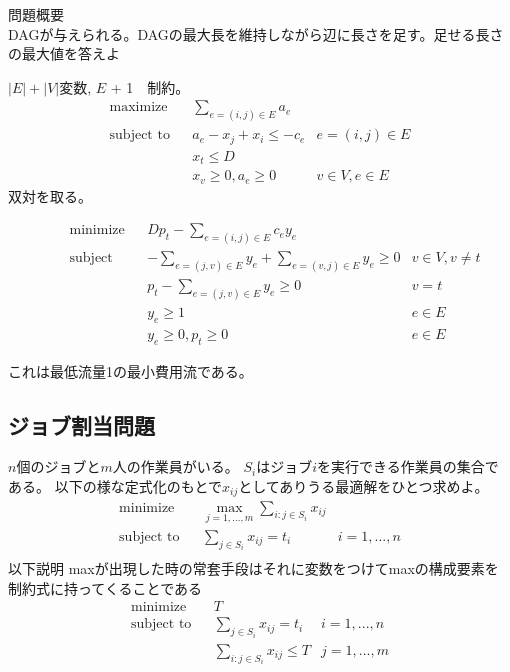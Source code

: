 \documentclass[13pt, a4paper, landscape]{jarticle}
\theoremstyle{nonitalic} %
\begin{document}
問題概要 \\
DAGが与えられる。DAGの最大長を維持しながら辺に長さを足す。足せる長さの最大値を答えよ

$|E|+|V|$変数, $E$ + 1　制約。
\begin{align}
 &&&&&\textrm{maximize}   && \sum_{e = (i,j)\in E} a_e \\
 &&&&&\textrm{subject to} && a_e - x_j + x_i \leq - c_e & e = (i,j) \in E  &&&&&\\
 &&&&&                    && x_t \leq  D &&&&&& \\
 &&&&&                    && x_v \geq 0, a_e \geq 0 & v \in V, e \in E &&&&&
\end{align}
双対を取る。

\begin{align}
  &&&&& \textrm{minimize}   && Dp_t - \sum_{e = (i,j )\in E} c_e y_e \\
  &&&&& \textrm{subject to} && -\sum_{e=(j,v) \in E} y_e + \sum_{e=(v,j) \in E} y_e \geq 0 & v \in V, v\neq t &&&&&\\
  &&&&&                     && p_t - \sum_{e=(j,v) \in E} y_e \geq 0 & v=t \\
  &&&&&                     && y_e \geq 1  & e \in E\\
  &&&&&                     && y_e \geq 0, p_t \geq 0 & e\in E
\end{align}


これは最低流量1の最小費用流である。

\subsection{ジョブ割当問題}
$n$個のジョブと$m$人の作業員がいる。
$S_i$はジョブ$i$を実行できる作業員の集合である。
以下の様な定式化のもとで$x_{ij}$としてありうる最適解をひとつ求めよ。
\begin{align}
  &&&&& \textrm{minimize}   && \max_{j=1,...,m} \sum_{i:j \in S_i} x_{ij} \\
  &&&&& \textrm{subject to} && \sum_{j \in S_i} x_{ij} = t_i  & i=1,...,n &&&&&\\
\end{align}
以下説明
maxが出現した時の常套手段はそれに変数をつけてmaxの構成要素を制約式に持ってくることである
\begin{align}
  &&&&& \textrm{minimize}   && T \\
  &&&&& \textrm{subject to} && \sum_{j \in S_i} x_{ij} = t_i  & i=1,...,n &&&&&\\
  &&&&&                     &&  \sum_{i:j \in S_i} x_{ij} \leq T & j=1,...,m
\end{align}
\end{document}
